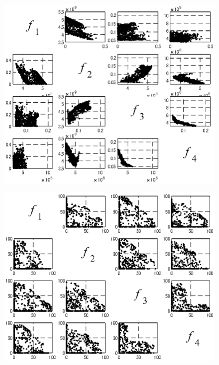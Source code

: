 \begin{figure}[htbp]
    \begin{center}
        \begin{minipage}{0.45\textwidth}
            \begin{center}
                \includegraphics[width=1\textwidth,keepaspectratio=true]{fig/robust_result_pareto_matrix.eps}\\\vspace{-5mm}{\small (a)空調スケジュールロバスト最適化問題}
            \end{center}
        \end{minipage}
        \begin{minipage}{0.45\textwidth}
            \begin{center}
                \includegraphics[width=1\textwidth,keepaspectratio=true]{fig/robust_result_pareto_matrix_benchmark_DTLZ1.eps}\\\vspace{-5mm}{\small (b)DTLZ1問題}

\end{center}
\end{minipage}
\end{center}
\end{figure}

